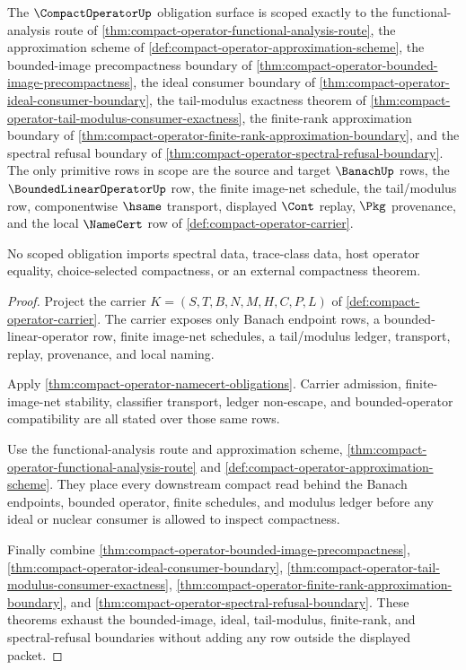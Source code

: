 \begin{theorem}
\label{thm:compact-operator-obligation-scope}
The $\CompactOperatorUp$ obligation surface is scoped exactly to the functional-analysis route of \autoref{thm:compact-operator-functional-analysis-route}, the approximation scheme of \autoref{def:compact-operator-approximation-scheme}, the bounded-image precompactness boundary of \autoref{thm:compact-operator-bounded-image-precompactness}, the ideal consumer boundary of \autoref{thm:compact-operator-ideal-consumer-boundary}, the tail-modulus exactness theorem of \autoref{thm:compact-operator-tail-modulus-consumer-exactness}, the finite-rank approximation boundary of \autoref{thm:compact-operator-finite-rank-approximation-boundary}, and the spectral refusal boundary of \autoref{thm:compact-operator-spectral-refusal-boundary}. The only primitive rows in scope are the source and target $\BanachUp$ rows, the $\BoundedLinearOperatorUp$ row, the finite image-net schedule, the tail/modulus row, componentwise $\hsame$ transport, displayed $\Cont$ replay, $\Pkg$ provenance, and the local $\NameCert$ row of \autoref{def:compact-operator-carrier}.

No scoped obligation imports spectral data, trace-class data, host operator equality, choice-selected compactness, or an external compactness theorem.
\end{theorem}
\begin{proof}
Project the carrier $K=(S,T,B,N,M,H,C,P,L)$ of \autoref{def:compact-operator-carrier}. The carrier exposes only Banach endpoint rows, a bounded-linear-operator row, finite image-net schedules, a tail/modulus ledger, transport, replay, provenance, and local naming.

Apply \autoref{thm:compact-operator-namecert-obligations}. Carrier admission, finite-image-net stability, classifier transport, ledger non-escape, and bounded-operator compatibility are all stated over those same rows.

Use the functional-analysis route and approximation scheme, \autoref{thm:compact-operator-functional-analysis-route} and \autoref{def:compact-operator-approximation-scheme}. They place every downstream compact read behind the Banach endpoints, bounded operator, finite schedules, and modulus ledger before any ideal or nuclear consumer is allowed to inspect compactness.

Finally combine \autoref{thm:compact-operator-bounded-image-precompactness}, \autoref{thm:compact-operator-ideal-consumer-boundary}, \autoref{thm:compact-operator-tail-modulus-consumer-exactness}, \autoref{thm:compact-operator-finite-rank-approximation-boundary}, and \autoref{thm:compact-operator-spectral-refusal-boundary}. These theorems exhaust the bounded-image, ideal, tail-modulus, finite-rank, and spectral-refusal boundaries without adding any row outside the displayed packet.
\end{proof}

